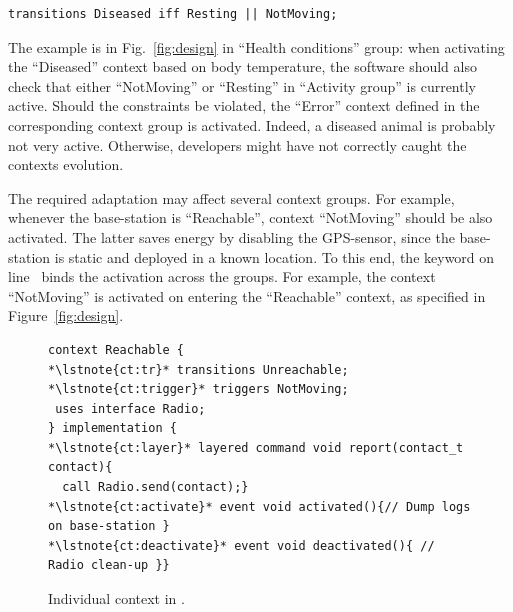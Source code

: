 \vspace{-1mm}
\begin{lstlisting}[language=conesc]
transitions Diseased iff Resting || NotMoving;
\end{lstlisting}
\vspace{-1.5mm}

The example is in Fig.~\ref{fig:design} in ``Health conditions'' group: when
activating the ``Diseased'' context based on body temperature, the software
should also check that either ``NotMoving'' or ``Resting'' in ``Activity group''
is currently active. Should the constraints be violated, the ``Error'' context
defined in the corresponding context group is activated. Indeed, a diseased
animal is probably not very active. Otherwise, developers might have not
correctly caught the contexts evolution.

The required adaptation may affect several context groups. For example, whenever
the base-station is ``Reachable'', context ``NotMoving'' should be also activated.
The latter saves energy by disabling the GPS-sensor, since the base-station is
static and deployed in a known location. To this end, the keyword
 on line~ binds the activation across the
groups. For example, the context ``NotMoving'' is activated on entering the
``Reachable'' context, as specified in Figure~\ref{fig:design}.


\begin{figure}[!tb]
\begin{lstlisting}[style=conescframe]
context Reachable {
*\lstnote{ct:tr}* transitions Unreachable;
*\lstnote{ct:trigger}* triggers NotMoving;
 uses interface Radio;
} implementation {
*\lstnote{ct:layer}* layered command void report(contact_t contact){
  call Radio.send(contact);}
*\lstnote{ct:activate}* event void activated(){// Dump logs on base-station }
*\lstnote{ct:deactivate}* event void deactivated(){ // Radio clean-up }}
\end{lstlisting}
\vspace{-3mm}
\caption{Individual context in \conesc.}
  \label{fig:context}
\vspace{-7mm}
\end{figure}
